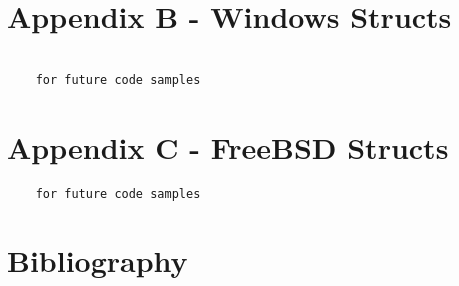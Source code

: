   \section{Appendix B - Windows Structs}
  \begin{lstlisting}

    for future code samples
  \end{lstlisting}
  \section{Appendix C - FreeBSD Structs}
  \begin{lstlisting}
    for future code samples

  \end{lstlisting}

  \section{Bibliography}
%   
%   
%
% 
